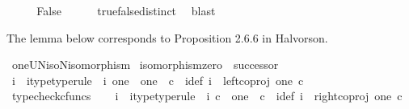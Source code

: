 \begin{isabellebody}
\isanewline
\ \ \isamarkupfalse%
\ \isamarkupfalse%
\ False\isanewline
\ \ \ \ \isamarkupfalse%
\ true{\isacharunderscore}{\kern0pt}false{\isacharunderscore}{\kern0pt}distinct\ \isamarkupfalse%
\ blast\isanewline
{}\isamarkupfalse%
%
\endisatagproof
{\isafoldproof}%
%
\isadelimproof
%
\endisadelimproof
%
\begin{isamarkuptext}%
The lemma below corresponds to Proposition 2.6.6 in Halvorson.%
\end{isamarkuptext}\isamarkuptrue%
\isamarkupfalse%
\ oneUN{\isacharunderscore}{\kern0pt}iso{\isacharunderscore}{\kern0pt}N{\isacharunderscore}{\kern0pt}isomorphism{\isacharcolon}{\kern0pt}\isanewline
\ {\isachardoublequoteopen}isomorphism{\isacharparenleft}{\kern0pt}zero\ {\isasymamalg}\ successor{\isacharparenright}{\kern0pt}{\isachardoublequoteclose}\ \isanewline
%
\isadelimproof
%
\endisadelimproof
%
\isatagproof
{}\isamarkupfalse%
\ {\isacharminus}{\kern0pt}\ \isanewline
\ \ \isamarkupfalse%
\ i{}\ \ i{}{\isacharunderscore}{\kern0pt}type{\isacharbrackleft}{\kern0pt}type{\isacharunderscore}{\kern0pt}rule{\isacharbrackright}{\kern0pt}{\isacharcolon}{\kern0pt}\ \ {\isachardoublequoteopen}i{}{\isacharcolon}{\kern0pt}\ one\ {\isasymrightarrow}\ {\isacharparenleft}{\kern0pt}one\ {\isasymCoprod}\ {\isasymnat}\isactrlsub c{\isacharparenright}{\kern0pt}{\isachardoublequoteclose}\ \ i{}{\isacharunderscore}{\kern0pt}def{\isacharcolon}{\kern0pt}\ {\isachardoublequoteopen}i{}\ {\isacharequal}{\kern0pt}\ left{\isacharunderscore}{\kern0pt}coproj\ one\ {\isasymnat}\isactrlsub c{\isachardoublequoteclose}\isanewline
\ \ \ \ \isamarkupfalse%
\ typecheck{\isacharunderscore}{\kern0pt}cfuncs\isanewline
\ \ \isamarkupfalse%
\ i{}\ \ i{}{\isacharunderscore}{\kern0pt}type{\isacharbrackleft}{\kern0pt}type{\isacharunderscore}{\kern0pt}rule{\isacharbrackright}{\kern0pt}{\isacharcolon}{\kern0pt}\ \ {\isachardoublequoteopen}i{}{\isacharcolon}{\kern0pt}\ {\isasymnat}\isactrlsub c\ {\isasymrightarrow}\ {\isacharparenleft}{\kern0pt}one\ {\isasymCoprod}\ {\isasymnat}\isactrlsub c{\isacharparenright}{\kern0pt}{\isachardoublequoteclose}\ \ i{}{\isacharunderscore}{\kern0pt}def{\isacharcolon}{\kern0pt}\ {\isachardoublequoteopen}i{}\ {\isacharequal}{\kern0pt}\ right{\isacharunderscore}{\kern0pt}coproj\ one\ {\isasymnat}\isactrlsub c{\isachardoublequoteclose}\isanewline

\end{isabellebody}
